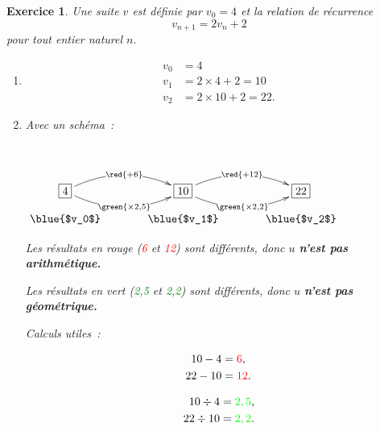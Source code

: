 \documentclass[10pt]{article}
\newtheorem{exo}{Exercice}
\begin{document}
\begin{exo}

Une suite $v$ est définie par $v_0=4$ et la relation de récurrence \[v_{n+1}=2v_n+2\] pour tout entier naturel $n.$

\begin{enumerate}
\item \begin{align*}
v_0&=4\\
v_1&=2\times 4+2=10\\
v_2&=2\times 10+2=22.\end{align*}

\newpage
\item Avec un schéma~:

\setlength{\columnseprule}{1pt}

\begin{multicols}{2}
~{}\begin{center}
    $\xymatrix@R=0.5pc@C=3pc{
    *+[F]+{4} \ar@/^0.5cm/[r]|{\red{+6}} \ar@/_0.5cm/[r]|{\green{\times 2,5}} & 
    *+[F]+{10} \ar@/^0.5cm/[r]|{\red{+12}} \ar@/_0.5cm/[r]|{\green{\times 2,2}} & *+[F]+{22} \\
    \txt{\blue{$v_0$}}&
    \txt{\blue{$v_1$}}&\txt{\blue{$v_2$}}    
    }$
    \end{center}
    
    
    \medskip
    
    Les résultats en rouge (\textcolor{red}{6} et \textcolor{red}{12}) sont différents, donc $u$ \textbf{n'est pas arithmétique.}
    
    \medskip
    
    Les résultats en vert (\textcolor{green}{2,5} et \textcolor{green}{2,2}) sont différents, donc $u$ \textbf{n'est pas géométrique.}
    
  \columnbreak
  
  Calculs utiles~:
  
  \medskip
  
  \begin{align*}
  10-4&=\textcolor{red}{6},\\
  22-10&= \textcolor{red}{12}.
  \end{align*}
  
  \medskip
  
  \begin{align*}
  10\div 4&=\textcolor{green}{2,5},\\
  22\div 10&= \textcolor{green}{2,2}.
  \end{align*}
  
  \end{multicols}


\end{enumerate}
\end{exo}
\end{document}
